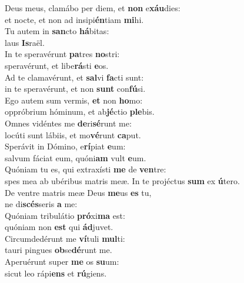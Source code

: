 \evenverse Deus meus, clamábo per diem, et \textbf{non} e\textbf{xáu}dies:~\*\\
\evenverse et nocte, et non ad insipi\textbf{én}tiam \textbf{mi}hi.\\
\oddverse Tu autem in \textbf{san}cto \textbf{há}bitas:~\*\\
\oddverse laus \textbf{Is}raël.\\
\evenverse In te speravérunt \textbf{pa}tres \textbf{no}stri:~\*\\
\evenverse speravérunt, et libe\textbf{rá}sti \textbf{e}os.\\
\oddverse Ad te clamavérunt, et \textbf{sal}vi \textbf{fa}cti sunt:~\*\\
\oddverse in te speravérunt, et non \textbf{sunt} con\textbf{fú}si.\\
\evenverse Ego autem sum vermis, \textbf{et} non \textbf{ho}mo:~\*\\
\evenverse oppróbrium hóminum, et ab\textbf{jé}ctio \textbf{ple}bis.\\
\oddverse Omnes vidéntes me \textbf{de}ri\textbf{sé}runt me:~\*\\
\oddverse locúti sunt lábiis, et mo\textbf{vé}runt \textbf{ca}put.\\
\evenverse Sperávit in Dómino, e\textbf{rí}piat \textbf{e}um:~\*\\
\evenverse salvum fáciat eum, quóni\textbf{am} vult \textbf{e}um.\\
\oddverse Quóniam tu es, qui extraxísti \textbf{me} de \textbf{ven}tre:~\*\\
\oddverse spes mea ab ubéribus matris meæ. In te projéctus \textbf{sum} ex \textbf{ú}tero.\\
\evenverse De ventre matris meæ Deus \textbf{me}us \textbf{es} tu,~\*\\
\evenverse ne di\textbf{scés}seris \textbf{a} me:\\
\oddverse Quóniam tribulátio \textbf{pró}xi\textbf{ma} est:~\*\\
\oddverse quóniam non \textbf{est} qui \textbf{ád}juvet.\\
\evenverse Circumdedérunt me \textbf{ví}tuli \textbf{mul}ti:~\*\\
\evenverse tauri pingues \textbf{ob}se\textbf{dé}runt me.\\
\oddverse Aperuérunt super \textbf{me} os \textbf{su}um:~\*\\
\oddverse sicut leo rápi\textbf{ens} et \textbf{rú}giens.\\
